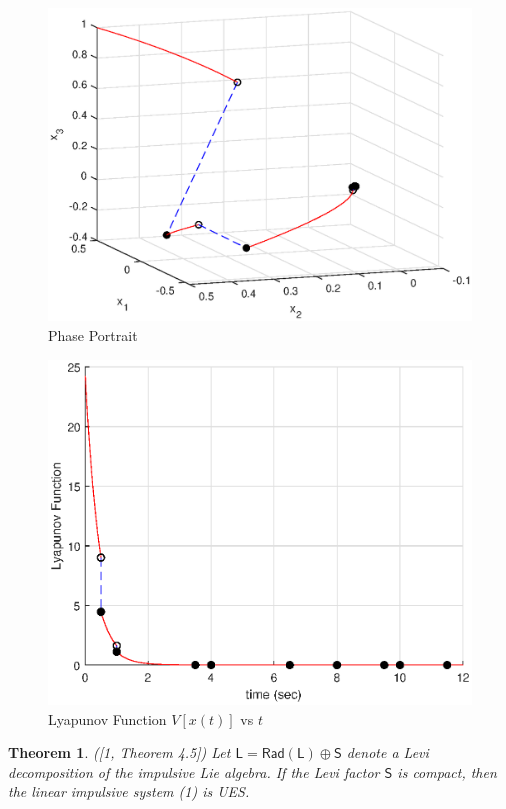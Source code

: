 \documentclass[11pt,a4paper]{article}
\newtheorem{theorem}{Theorem}
\begin{document}
\begin{figure}
\centering
\includegraphics[scale=0.8]{FG8.eps} 
\caption{Phase Portrait}
\end{figure}

\begin{figure}
\centering
\includegraphics[scale=0.8]{FG9.eps} 
\caption{Lyapunov Function $V[x(t)]$ vs $t$}
\end{figure}

\pagebreak

\begin{theorem} ([1, Theorem 4.5]) Let $\mathsf{L} = \mathsf{Rad} ( \mathsf{L} ) \oplus \mathsf{S}$ denote a Levi decomposition of the impulsive Lie algebra.  If the Levi factor $\mathsf{S}$ is compact, then the linear impulsive system (1) is UES.
\end{theorem}
\end{document}
